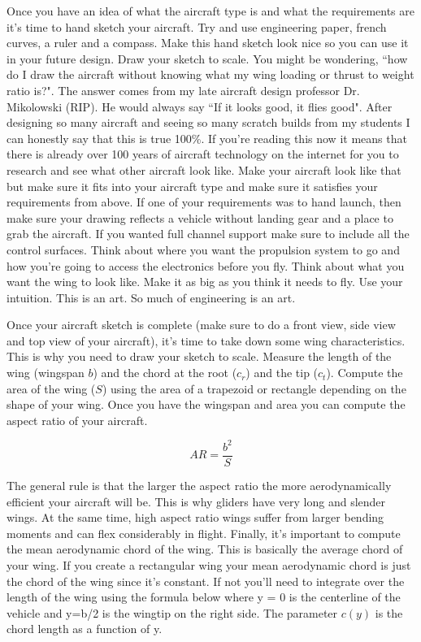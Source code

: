 \documentclass{article}
\def\beq{\begin{equation}}
\def\eeq{\end{equation}}
\begin{document}
Once you have an idea of what the aircraft type is and what the
requirements are it's time to hand sketch your aircraft. Try and use
engineering paper, french curves, a ruler and a compass. Make this
hand sketch look nice so you can use it in your future design. Draw
your sketch to scale. You might be wondering, ``how do I draw the
aircraft without knowing what my wing loading or thrust to weight
ratio is?". The answer comes from my late aircraft design professor
Dr. Mikolowski (RIP). He would always say ``If it looks good, it flies
good". After designing so many aircraft and seeing so many scratch
builds from my students I can honestly say that this is true
100\%. If you're reading this now it means that there is already over
100 years of aircraft technology on the internet for you to research
and see what other aircraft look like. Make your aircraft look like
that but make sure it fits into your aircraft type and make sure it
satisfies your requirements from above. If one of your requirements
was to hand launch, then make sure your drawing reflects a vehicle
without landing gear and a place to grab the aircraft. If you wanted
full channel support make sure to include all the control
surfaces. Think about where you want the propulsion system to go and
how you're going to access the electronics before you fly. Think about
what you want the wing to look like. Make it as big as you think it
needs to fly. Use your intuition. This is an art. So much of
engineering is an art.

Once your aircraft sketch is complete (make sure to do a front view,
side view and top view of your aircraft), it's time to take down some
wing characteristics. This is why you need to draw your sketch to
scale. Measure the length of the wing (wingspan $b$) and the chord at the
root ($c_r$) and the tip ($c_t$). Compute the area of the wing ($S$) using
the area of a trapezoid or rectangle depending on the shape of your
wing. Once you have the wingspan and area you can compute the aspect
ratio of your aircraft.

\beq
AR = \frac{b^2}{S}
\eeq

The general rule is that the larger the aspect ratio the more
aerodynamically efficient your aircraft will be. This is why gliders
have very long and slender wings. At the same time, high aspect ratio
wings suffer from larger bending moments and can flex considerably in
flight. Finally, it's important to compute the mean aerodynamic chord
of the wing. This is basically the average chord of your wing. If you
create a rectangular wing your mean aerodynamic chord is just the
chord of the wing since it's constant. If not you'll need to integrate
over the length of the wing using the formula below where y = 0 is the
centerline of the vehicle and y=b/2 is the wingtip on the right
side\cite{caughey}. The parameter $c(y)$ is the chord length as a
function of y.
\end{document}
